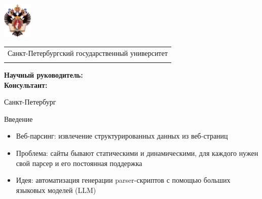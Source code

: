 \documentclass
  [ russian
  , aspectratio=1610 %
  ] {beamer}
\title[Короткое название]{\my@title@title@ru}
\author[\my@title@author@ru]{\my@title@author@ru, группа \academicGroup}
\institute[СПбГУ]{}
\date[9 сентября 2024 г.]{}
\makeatletter
\newcommand{\advisorChair}{\my@title@chair@ru}
\newcommand{\supervisor}{\my@title@supervisor@ru}
\newcommand{\supervisorPosition}{\my@title@supervisorPosition@ru}
\newcommand{\consultant}{\my@title@consultant@ru}
\newcommand{\consultantPosition}{\my@title@consultantPosition@ru}
\newcommand{\defenseYear}{\my@title@year@ru}
\makeatother
\begin{document}
{
\begin{frame}
    \includegraphics[width=1.4cm]{figures/SPbGU_Logo.png}
    \vspace{-35pt}
    \hspace{-10pt}
    \begin{center}
        \begin{tabular}{c}
            \scriptsize{Санкт-Петербургский государственный университет} \\
            \scriptsize{\advisorChair}
        \end{tabular}
        \titlepage
    \end{center}

    \btVFill

    {\scriptsize
        \textbf{Научный руководитель:}  \supervisorPosition~\supervisor \\
        \textbf{Консультант:}  \consultantPosition~\consultant \\
    }
    \makeatother
    \begin{center}
        \vspace{5pt}
        \scriptsize{Санкт-Петербург\\ \defenseYear}
    \end{center}
\end{frame}
}


\begin{frame}{Введение}
    \begin{itemize}
        \item Веб-парсинг: извлечение структурированных данных из веб-страниц
        \item Проблема: сайты бывают статическими и динамическими, для каждого нужен свой парсер и его постоянная поддержка
        \item Идея: автоматизация генерации parser-скриптов с помощью больших языковых моделей (LLM)
    \end{itemize}
\end{frame}
\end{document}

